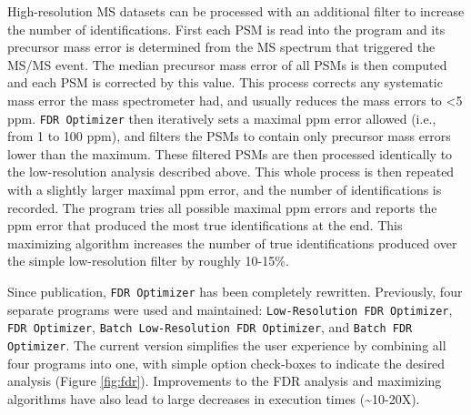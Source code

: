 High-resolution MS datasets can be processed with an additional filter to increase the number of identifications. First each PSM is read into the program and its precursor mass error is determined from the MS spectrum that triggered the MS/MS event. The median precursor mass error of all PSMs is then computed and each PSM is corrected by this value. This process corrects any systematic mass error the mass spectrometer had, and usually reduces the mass errors to <5 ppm. \texttt{FDR Optimizer} then iteratively sets a maximal ppm error allowed (i.e., from 1 to 100 ppm), and filters the PSMs to contain only precursor mass errors lower than the maximum. These filtered PSMs are then processed identically to the low-resolution analysis described above. This whole process is then repeated with a slightly larger maximal ppm error, and the number of identifications is recorded. The program tries all possible maximal ppm errors and reports the ppm error that produced the most true identifications at the end. This maximizing algorithm increases the number of true identifications produced over the simple low-resolution filter by roughly 10-15\%.

Since publication, \texttt{FDR Optimizer} has been completely rewritten. Previously, four separate programs were used and maintained: \texttt{Low-Resolution FDR Optimizer}, \texttt{FDR Optimizer}, \texttt{Batch Low-Resolution FDR Optimizer}, and \texttt{Batch FDR Optimizer}. The current version simplifies the user experience by combining all four programs into one, with simple option check-boxes to indicate the desired analysis (Figure \ref{fig:fdr}). Improvements to the FDR analysis and maximizing algorithms have also lead to large decreases in execution times (\textasciitilde10-20X).

